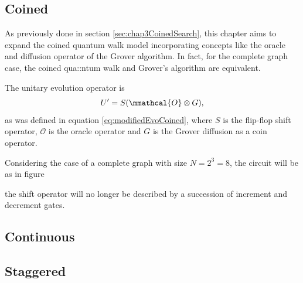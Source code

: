 \documentclass[../../dissertation.tex]{subfiles}
\begin{document}
\subsection{Coined}
As previously done in section \ref{sec:chap3CoinedSearch}, this chapter aims to expand the coined quantum walk model incorporating concepts like the oracle and diffusion operator of the Grover algorithm. In fact, for the complete graph case, the coined qua::ntum walk and Grover's algorithm are equivalent.\par
The unitary evolution operator is
\begin{equation}
        U' = S (\mmathcal{O} \otimes G),\label{eq:modifiedEvoCoinedQiskit}
\end{equation}
as was defined in equation \ref{eq:modifiedEvoCoined}, where $S$ is the flip-flop shift operator, $\mathcal{O}$ is the oracle operator and $G$ is the Grover diffusion as a coin operator.\par
Considering the case of a complete graph with size $N=2^3=8$, the circuit will be as in figure

the shift operator will no longer be described by a succession of increment and decrement gates. 
%

\subsection{Continuous}
\subsection{Staggered}
\end{document}
